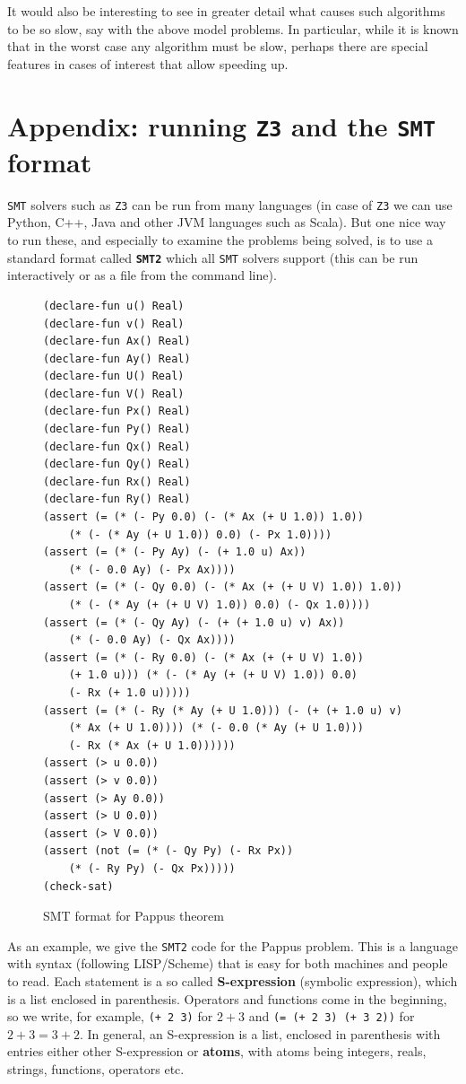 \documentclass{amsart}
\theoremstyle{plain}
\theoremstyle{definition}
\theoremstyle{remark}
\begin{document}
It would also be interesting to see in greater detail what causes such
algorithms to be so slow, say with the above model problems. In
particular, while it is known that in the worst case any algorithm must
be slow, perhaps there are special features in cases of interest that
allow speeding up.

\section{Appendix: running \texttt{Z3} and the \texttt{SMT} format}

\texttt{SMT} solvers such as \texttt{Z3} can be run from many languages (in case of \texttt{Z3} we
can use Python, C++, Java and other JVM languages such as Scala). But
one nice way to run these, and especially to examine the problems being
solved, is to use a standard format called \textbf{\texttt{SMT2}} which all \texttt{SMT}
solvers support (this can be run interactively or as a file from the
command line).


\begin{figure}
\begin{lstlisting}[language=LISP, frame=single]
(declare-fun u() Real)
(declare-fun v() Real)
(declare-fun Ax() Real)
(declare-fun Ay() Real)
(declare-fun U() Real)
(declare-fun V() Real)
(declare-fun Px() Real)
(declare-fun Py() Real)
(declare-fun Qx() Real)
(declare-fun Qy() Real)
(declare-fun Rx() Real)
(declare-fun Ry() Real)
(assert (= (* (- Py 0.0) (- (* Ax (+ U 1.0)) 1.0)) 
	(* (- (* Ay (+ U 1.0)) 0.0) (- Px 1.0))))
(assert (= (* (- Py Ay) (- (+ 1.0 u) Ax)) 
	(* (- 0.0 Ay) (- Px Ax))))
(assert (= (* (- Qy 0.0) (- (* Ax (+ (+ U V) 1.0)) 1.0)) 
	(* (- (* Ay (+ (+ U V) 1.0)) 0.0) (- Qx 1.0))))
(assert (= (* (- Qy Ay) (- (+ (+ 1.0 u) v) Ax)) 
	(* (- 0.0 Ay) (- Qx Ax))))
(assert (= (* (- Ry 0.0) (- (* Ax (+ (+ U V) 1.0)) 
	(+ 1.0 u))) (* (- (* Ay (+ (+ U V) 1.0)) 0.0) 
	(- Rx (+ 1.0 u)))))
(assert (= (* (- Ry (* Ay (+ U 1.0))) (- (+ (+ 1.0 u) v) 
	(* Ax (+ U 1.0)))) (* (- 0.0 (* Ay (+ U 1.0))) 
	(- Rx (* Ax (+ U 1.0))))))
(assert (> u 0.0))
(assert (> v 0.0))
(assert (> Ay 0.0))
(assert (> U 0.0))
(assert (> V 0.0))
(assert (not (= (* (- Qy Py) (- Rx Px)) 
	(* (- Ry Py) (- Qx Px)))))
(check-sat)
\end{lstlisting}
\caption{SMT format for Pappus theorem}\label{smt-pappus}
\end{figure}

As an example, we give the \texttt{SMT2} code for the Pappus problem. This is a language
with syntax (following LISP/Scheme) that is easy for both machines and
people to read. Each statement is a so called \textbf{S-expression}
(symbolic expression), which is a list enclosed in parenthesis.
Operators and functions come in the beginning, so we write, for example,
\texttt{(+\ 2\ 3)} for \(2 + 3\) and \texttt{(=\ (+\ 2\ 3)\ (+\ 3\ 2))}
for \(2 + 3 = 3 + 2\). In general, an S-expression is a list, enclosed
in parenthesis with entries either other S-expression or \textbf{atoms},
with atoms being integers, reals, strings, functions, operators etc.
\end{document}
